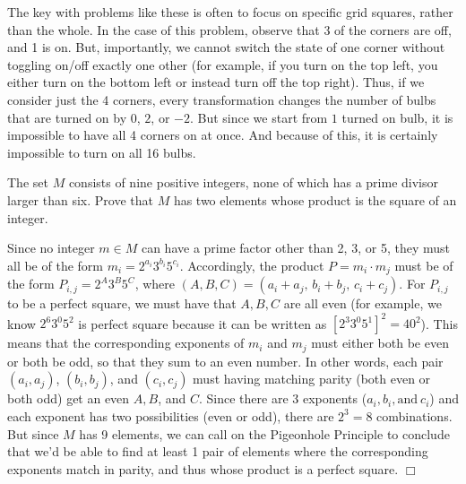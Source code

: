 \begin{solution}[No, we can't.]
    The key with problems like these is often to focus on specific grid squares, rather than the whole. In the case of this problem, observe that 3 of the corners are off, and 1 is on. But, importantly, we cannot switch the state of one corner without toggling on/off exactly one other (for example, if you turn on the top left, you either turn on the bottom left or instead turn off the top right). Thus, if we consider just the 4 corners, every transformation changes the number of bulbs that are turned on by $0$, $2$, or $-2$. But since we start from $1$ turned on bulb, it is impossible to have all 4 corners on at once. And because of this, it is certainly impossible to turn on all 16 bulbs.
\end{solution}

\begin{problem}
    The set $M$ consists of nine positive integers, none of which has a prime divisor larger than six. Prove that $M$ has two elements whose product is the square of an integer.
\end{problem}

\begin{solution}
    Since no integer $m \in M$ can have a prime factor other than 2, 3, or 5, they must all be of the form $m_i = 2^{a_i}3^{b_i}5^{c_i}$. Accordingly, the product $P = m_i \cdot m_j$ must be of the form $P_{i,j}=2^A 3^B 5^C$, where $(A,B,C)=(a_i+a_j,\, b_i+b_j,\, c_i+c_j)$. For $P_{i,j}$ to be a perfect square, we must have that $A,B,C$ are all even (for example, we know $2^6 3^0 5^2$ is perfect square because it can be written as $\left[ 2^3 3^0 5^1 \right]^2 = 40^2$). This means that the corresponding exponents of $m_i$ and $m_j$ must either both be even or both be odd, so that they sum to an even number. In other words, each pair $(a_i, a_j)$, $(b_i, b_j)$, and $(c_i, c_j)$ must having matching parity (both even or both odd) get an even $A,B$, and $C$. Since there are 3 exponents ($a_i, b_i, \text{and}\ c_i$) and each exponent has two possibilities (even or odd), there are $2^3=8$ combinations. But since $M$ has 9 elements, we can call on the Pigeonhole Principle to conclude that we'd be able to find at least 1 pair of elements where the corresponding exponents match in parity, and thus whose product is a perfect square. $\Box$
\end{solution}

